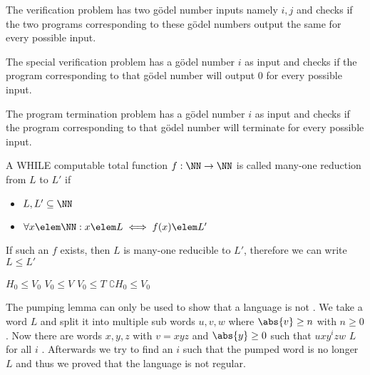 \documentclass[10pt,a4paper,english]{article}
\begin{document}
    \newpage


    \newpage
    The verification problem has two gödel number inputs namely $i, j$ and checks if the two programs corresponding to these gödel numbers output the same
    for every possible input.\newline

    The special verification problem has a gödel number $i$ as input and checks if the program corresponding to that gödel number will output
    0 for every possible input.\newline

    The program termination problem has a gödel number $i$ as input and checks if the program corresponding to that gödel number will terminate
    for every possible input.\newline

    A WHILE computable total function $f: \NN \rightarrow \NN$ is called many-one reduction from $L$ to $L'$ if
    \begin{itemize}
        \item $L, L' \subseteq \NN$
        \item $\forall x \elem \NN: x \elem L \iff f(x) \elem L'$
    \end{itemize}
    If such an $f$ exists, then $L$ is many-one reducible to $L'$, therefore we can write $L \leq L'$\newline

    $H_0 \leq V_0$\newline
    $V_0 \leq V$\newline
    $V_0 \leq T$\newline
    $\complement{H_0} \leq V_0$\newline


    \newpage
    The pumping lemma can only be used to show that a language is not \REG. We take a word \word \elem $L$ and split it into multiple sub words $u,v,w$
    where $\abs{v}\geq n$ with $n \ge 0$. Now there are words $x,y,z$ with $v=xyz$ and $\abs{y} \ge 0$ such that $uxy^izw$ \elem $L$ for all
    $i$ \elem \NN. Afterwards we try to find an $i$ such that the pumped word is no longer \elem $L$ and thus we proved that the language is not regular.
\end{document}
